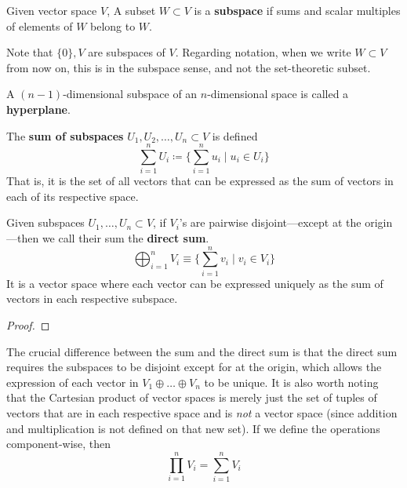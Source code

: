   \begin{definition}[Subspace]
    Given vector space $V$, A subset $W \subset V$ is a \textbf{subspace} if sums and scalar multiples of elements of $W$ belong to $W$. 
  \end{definition}

  Note that $\{ 0 \}, V$ are subspaces of $V$. Regarding notation, when we write $W \subset V$ from now on, this is in the subspace sense, and not the set-theoretic subset. 

  \begin{definition}[Hyperplane]
    A $(n - 1)$-dimensional subspace of an $n$-dimensional space is called a \textbf{hyperplane}. 
  \end{definition}

  \begin{definition}
    The \textbf{sum of subspaces} $U_1, U_2, \ldots, U_n \subset V$ is defined 
    \begin{equation}
      \sum_{i=1}^n U_i \coloneqq \Big\{ \sum_{i = 1}^n u_i \mid u_i \in U_i\Big\}
    \end{equation}
    That is, it is the set of all vectors that can be expressed as the sum of vectors in each of its respective space. 
  \end{definition}

  \begin{definition}
    Given subspaces $U_1, \ldots, U_n \subset V$, if $V_i$'s are pairwise disjoint---except at the origin---then we call their sum the \textbf{direct sum}. 
    \begin{equation}
      \bigoplus_{i=1}^n V_i \equiv \Big\{ \sum_{i=1}^n v_i \; | \; v_i \in V_i\Big\}
    \end{equation}
    It is a vector space where each vector can be expressed uniquely as the sum of vectors in each respective subspace. 
  \end{definition}
  \begin{proof}
    
  \end{proof}

  The crucial difference between the sum and the direct sum is that the direct sum requires the subspaces to be disjoint except for at the origin, which allows the expression of each vector in $V_1 \oplus \ldots \oplus V_n$ to be unique. It is also worth noting that the Cartesian product of vector spaces is merely just the set of tuples of vectors that are in each respective space and is \textit{not} a vector space (since addition and multiplication is not defined on that new set). If we define the operations component-wise, then 
  \begin{equation}
    \prod_{i=1}^n V_i = \sum_{i=1}^n V_i
  \end{equation}

